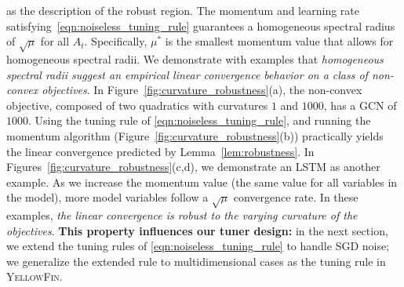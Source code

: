 \documentclass{article}
\newcommand{\mat}[1]{\bm{\mathit{#1}}}
\newcommand{\tuner}{\textsc{YellowFin}\xspace}
\begin{document}
as the description of the robust region. The momentum and learning rate satisfying~\eqref{eqn:noiseless_tuning_rule} guarantees a homogeneous spectral radius of $\sqrt{\mu}$ for all $\mat{A}_t$.
Specifically, $\mu^*$ is the smallest momentum value that allows for homogeneous spectral radii.
We demonstrate with examples that \emph{homogeneous spectral radii suggest an empirical linear convergence behavior on a class of non-convex objectives}. In Figure~\ref{fig:curvature_robustness}(a), the non-convex objective,
composed of two quadratics with curvatures $1$ and $1000$, has a GCN of $1000$.
Using the tuning rule of \eqref{eqn:noiseless_tuning_rule}, and running the momentum algorithm (Figure~\ref{fig:curvature_robustness}(b)) practically yields the linear convergence predicted by Lemma~\ref{lem:robustness}.
In Figures~\ref{fig:curvature_robustness}(c,d), we demonstrate an LSTM as another example. As we increase the momentum value (the same value for all variables in the model), more model variables follow a $\sqrt{\mu}$ convergence rate.
In these examples, \emph{the linear convergence is robust to the varying curvature of the objectives}. \textbf{This property influences our tuner design:}
{in the next section, we extend the tuning rules of \eqref{eqn:noiseless_tuning_rule} to handle SGD noise; 
we generalize the extended rule to multidimensional cases as the tuning rule in \tuner}.
\end{document}
